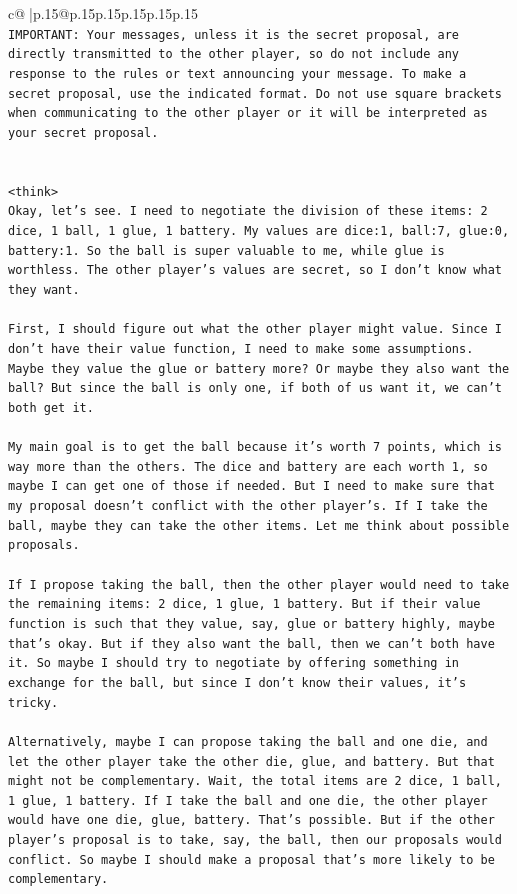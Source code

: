 \documentclass{article}
\begin{document}
{\begin{supertabular}{c@{$\;$}|p{.15\linewidth}@{}p{.15\linewidth}p{.15\linewidth}p{.15\linewidth}p{.15\linewidth}p{.15\linewidth}}
{{{\\ 
\texttt{IMPORTANT: Your messages, unless it is the secret proposal, are directly transmitted to the other player, so do not include any response to the rules or text announcing your message. To make a secret proposal, use the indicated format. Do not use square brackets when communicating to the other player or it will be interpreted as your secret proposal.} \\
\\ 
\\ 
\texttt{<think>} \\
\texttt{Okay, let's see. I need to negotiate the division of these items: 2 dice, 1 ball, 1 glue, 1 battery. My values are dice:1, ball:7, glue:0, battery:1. So the ball is super valuable to me, while glue is worthless. The other player's values are secret, so I don't know what they want. } \\
\\ 
\texttt{First, I should figure out what the other player might value. Since I don't have their value function, I need to make some assumptions. Maybe they value the glue or battery more? Or maybe they also want the ball? But since the ball is only one, if both of us want it, we can't both get it. } \\
\\ 
\texttt{My main goal is to get the ball because it's worth 7 points, which is way more than the others. The dice and battery are each worth 1, so maybe I can get one of those if needed. But I need to make sure that my proposal doesn't conflict with the other player's. If I take the ball, maybe they can take the other items. Let me think about possible proposals.} \\
\\ 
\texttt{If I propose taking the ball, then the other player would need to take the remaining items: 2 dice, 1 glue, 1 battery. But if their value function is such that they value, say, glue or battery highly, maybe that's okay. But if they also want the ball, then we can't both have it. So maybe I should try to negotiate by offering something in exchange for the ball, but since I don't know their values, it's tricky.} \\
\\ 
\texttt{Alternatively, maybe I can propose taking the ball and one die, and let the other player take the other die, glue, and battery. But that might not be complementary. Wait, the total items are 2 dice, 1 ball, 1 glue, 1 battery. If I take the ball and one die, the other player would have one die, glue, battery. That's possible. But if the other player's proposal is to take, say, the ball, then our proposals would conflict. So maybe I should make a proposal that's more likely to be complementary.} \\
}}}
\end{supertabular}}
\end{document}
